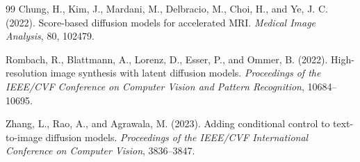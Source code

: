 \documentclass{article}
\begin{document}
{\begin{thebibliography}{99}
Chung, H., Kim, J., Mardani, M., Delbracio, M., Choi, H., and Ye, J. C. (2022).
Score-based diffusion models for accelerated MRI.
\textit{Medical Image Analysis}, 80, 102479.

Rombach, R., Blattmann, A., Lorenz, D., Esser, P., and Ommer, B. (2022).
High-resolution image synthesis with latent diffusion models.
\textit{Proceedings of the IEEE/CVF Conference on Computer Vision and Pattern Recognition}, 10684--10695.

Zhang, L., Rao, A., and Agrawala, M. (2023).
Adding conditional control to text-to-image diffusion models.
\textit{Proceedings of the IEEE/CVF International Conference on Computer Vision}, 3836--3847.

\end{thebibliography}
}
\end{document}
